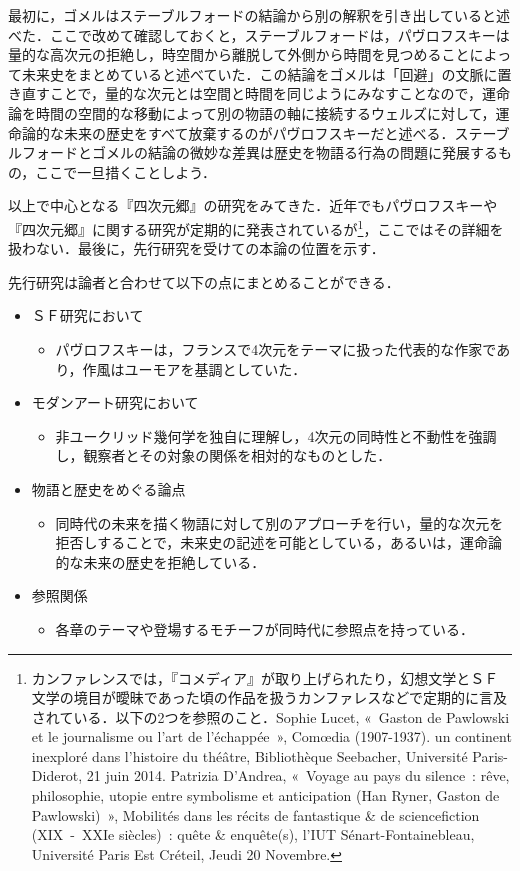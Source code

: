 最初に，ゴメルはステーブルフォードの結論から別の解釈を引き出していると述べた．ここで改めて確認しておくと，ステーブルフォードは，パヴロフスキーは量的な高次元の拒絶し，時空間から離脱して外側から時間を見つめることによって未来史をまとめていると述べていた．この結論をゴメルは「回避」の文脈に置き直すことで，量的な次元とは空間と時間を同じようにみなすことなので，運命論を時間の空間的な移動によって別の物語の軸に接続するウェルズに対して，運命論的な未来の歴史をすべて放棄するのがパヴロフスキーだと述べる．ステーブルフォードとゴメルの結論の微妙な差異は歴史を物語る行為の問題に発展するもの，ここで一旦措くことしよう．

以上で中心となる『四次元郷』の研究をみてきた．近年でもパヴロフスキーや『四次元郷』に関する研究が定期的に発表されているが\footnote{カンファレンスでは，『コメディア』が取り上げられたり，幻想文学とＳＦ文学の境目が曖昧であった頃の作品を扱うカンファレスなどで定期的に言及されている．以下の2つを参照のこと．Sophie Lucet, «~Gaston de Pawlowski et le journalisme ou l’art de l’échappée~», Comœdia (1907-1937). un continent inexploré dans l'histoire du théâtre, Bibliothèque Seebacher, Université Paris-Diderot, 21 juin 2014. Patrizia D’Andrea, «~Voyage au pays du silence~: rêve, philosophie, utopie entre symbolisme et anticipation (Han Ryner, Gaston de Pawlowski)~», Mobilités dans les récits de fantastique \& de science­fiction (XIX~-~XXIe siècles)~: quête \& enquête(s), l'IUT Sénart-Fontainebleau, Université Paris Est Créteil, Jeudi 20 Novembre.}，ここではその詳細を扱わない．最後に，先行研究を受けての本論の位置を示す．

先行研究は論者と合わせて以下の点にまとめることができる．
\begin{itemize}
  \item ＳＦ研究において
    \begin{itemize}
      \item パヴロフスキーは，フランスで4次元をテーマに扱った代表的な作家であり，作風はユーモアを基調としていた．
    \end{itemize}
  \item モダンアート研究において
    \begin{itemize}
      \item 非ユークリッド幾何学を独自に理解し，4次元の同時性と不動性を強調し，観察者とその対象の関係を相対的なものとした．
    \end{itemize}
  \item 物語と歴史をめぐる論点
    \begin{itemize}
      \item 同時代の未来を描く物語に対して別のアプローチを行い，量的な次元を拒否しすることで，未来史の記述を可能としている，あるいは，運命論的な未来の歴史を拒絶している．
    \end{itemize}
  \item 参照関係
    \begin{itemize}
      \item 各章のテーマや登場するモチーフが同時代に参照点を持っている．
    \end{itemize}
\end{itemize}


